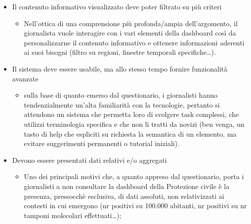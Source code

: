 \begin{itemize}
\begin{itemize}
    \end{itemize}
	\item Il contenuto informativo visualizzato deve poter filtrato su più criteri
	\begin{itemize}
        \item Nell'ottica di una comprensione più profonda/ampia dell'argomento, il giornalista vuole interagire con i vari elementi della dashboard così da personalizzarne il contenuto informativo e ottenere informazioni aderenti ai suoi bisogni (filtro su regioni, finestre temporali specifiche…).
    \end{itemize}
	\item Il sistema deve essere usabile, ma allo stesso tempo fornire funzionalità avanzate
	\begin{itemize}
        \item sulla base di quanto emerso dal questionario, i giornalisti hanno tendenzialmente un'alta familiarità con la tecnologie, pertanto si attendono un sistema che permetta loro di svolgere task complessi, che utilizzi terminologia specifica e che non li tratti da novizi (ben venga, un tasto di help che espliciti su richiesta la semantica di un elemento, ma evitare suggerimenti permanenti o tutorial iniziali).
    \end{itemize}
	\item Devono essere presentati dati relativi e/o aggregati
	\begin{itemize}
        \item Uno dei principali motivi che, a quanto appreso dal questionario, porta i giornalisti a non consultare la dashboard della Protezione civile è la presenza, pressocchè esclusiva, di dati assoluti, non relativizzati ai contesti in cui emergono (nr positivi su 100.000 abitanti, nr positivi su nr tamponi molecolari effettuati…);
    \end{itemize}
\end{itemize}
